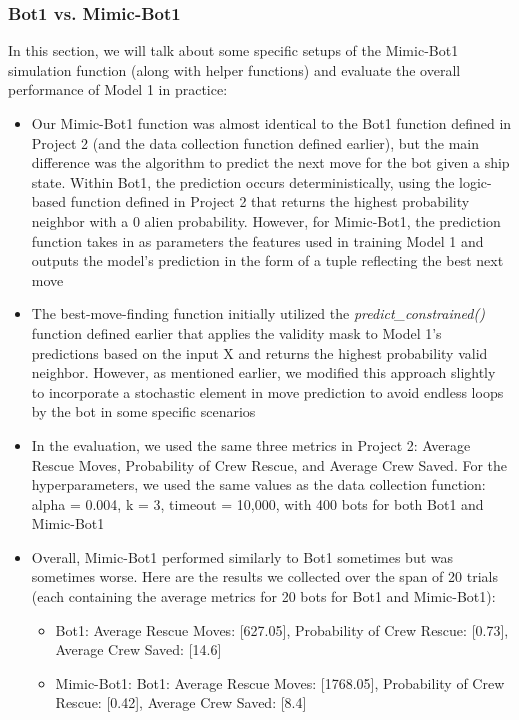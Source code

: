 \documentclass[11pt]{article}
\begin{document}
\subsubsection{Bot1 vs. Mimic-Bot1}

In this section, we will talk about some specific setups of the Mimic-Bot1 simulation function (along with helper functions) and evaluate the overall performance of Model 1 in practice:

\begin{itemize}
    \item Our Mimic-Bot1 function was almost identical to the Bot1 function defined in Project 2 (and the data collection function defined earlier), but the main difference was the algorithm to predict the next move for the bot given a ship state. Within Bot1, the prediction occurs deterministically, using the logic-based function defined in Project 2 that returns the highest probability neighbor with a 0 alien probability. However, for Mimic-Bot1, the prediction function takes in as parameters the features used in training Model 1 and outputs the model's prediction in the form of a tuple reflecting the best next move
    \item The best-move-finding function initially utilized the \emph{predict\_constrained()} function defined earlier that applies the validity mask to Model 1's predictions based on the input X and returns the highest probability valid neighbor. However, as mentioned earlier, we modified this approach slightly to incorporate a stochastic element in move prediction to avoid endless loops by the bot in some specific scenarios
    \item In the evaluation, we used the same three metrics in Project 2: Average Rescue Moves, Probability of Crew Rescue, and Average Crew Saved. For the hyperparameters, we used the same values as the data collection function: alpha = 0.004, k = 3, timeout = 10,000, with 400 bots for both Bot1 and Mimic-Bot1
    \item Overall, Mimic-Bot1 performed similarly to Bot1 sometimes but was sometimes worse. Here are the results we collected over the span of 20 trials (each containing the average metrics for 20 bots for Bot1 and Mimic-Bot1):
    \begin{itemize}
        \item Bot1: {Average Rescue Moves: [627.05]}, {Probability of Crew Rescue: [0.73]}, {Average Crew Saved: [14.6]}
        \item Mimic-Bot1: Bot1: {Average Rescue Moves: [1768.05]}, {Probability of Crew Rescue: [0.42]}, {Average Crew Saved: [8.4]}

\end{itemize}
\end{itemize}
\end{document}
